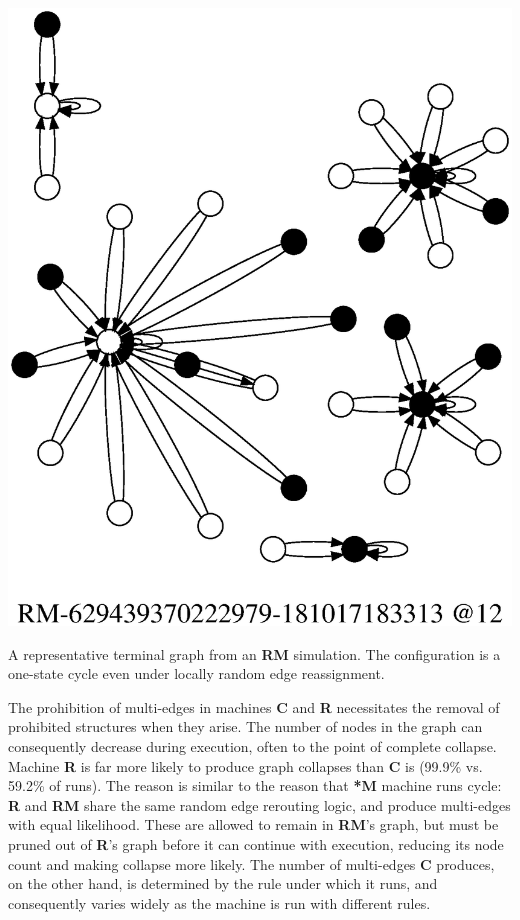 \documentclass{tufte-handout}
\begin{document}
\begin{marginfigure}
\includegraphics{terminal_RM_graph.ps}
\caption{A representative terminal graph from an \textbf{RM} simulation. The
configuration is a one-state cycle even under locally random edge reassignment.}
\label{fig:TerminalRMGraph}
\end{marginfigure}

The prohibition of multi-edges in machines \textbf{C} and \textbf{R}
necessitates the removal of prohibited structures when they arise. The
number of nodes in the graph can consequently decrease during execution,
often to the point of complete collapse.
Machine \textbf{R} is far more likely to produce graph collapses than
\textbf{C} is (99.9\% vs. 59.2\% of runs). The reason is similar to the reason
that \textbf{*M} machine runs cycle: \textbf{R} and \textbf{RM} share the same
random edge rerouting logic, and produce multi-edges with equal likelihood. These are allowed to
remain in \textbf{RM}'s graph, but must be pruned out of \textbf{R}'s graph
before it can continue with execution, reducing its node count and making collapse
more likely. The number of multi-edges \textbf{C} produces, on the other hand,
is determined by the rule under which it runs, and consequently varies widely as
the machine is run with different rules.
\end{document}
